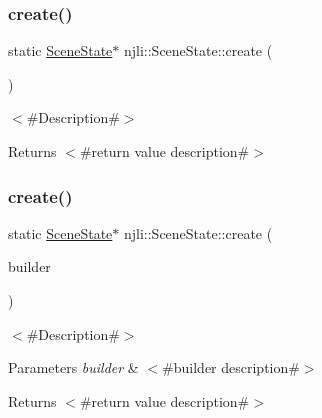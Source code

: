 \subsubsection{\texorpdfstring{create()}{create()}\hspace{0.1cm}{\footnotesize\ttfamily [2/3]}}
{\footnotesize\ttfamily static \mbox{\hyperlink{classnjli_1_1_scene_state}{Scene\+State}}$\ast$ njli\+::\+Scene\+State\+::create (\begin{DoxyParamCaption}{ }\end{DoxyParamCaption})\hspace{0.3cm}{\ttfamily [static]}}

$<$\#\+Description\#$>$

\begin{DoxyReturn}{Returns}
$<$\#return value description\#$>$ 
\end{DoxyReturn}
\mbox{\label{classnjli_1_1_scene_state_a61241c7c75c26c8b101933f902d59426}} 
\subsubsection{\texorpdfstring{create()}{create()}\hspace{0.1cm}{\footnotesize\ttfamily [3/3]}}
{\footnotesize\ttfamily static \mbox{\hyperlink{classnjli_1_1_scene_state}{Scene\+State}}$\ast$ njli\+::\+Scene\+State\+::create (\begin{DoxyParamCaption}\item[{const \mbox{\hyperlink{classnjli_1_1_scene_state_builder}{Scene\+State\+Builder}} \&}]{builder }\end{DoxyParamCaption})\hspace{0.3cm}{\ttfamily [static]}}

$<$\#\+Description\#$>$


\begin{DoxyParams}{Parameters}
{\em builder} & $<$\#builder description\#$>$\\
\hline
\end{DoxyParams}
\begin{DoxyReturn}{Returns}
$<$\#return value description\#$>$ 
\end{DoxyReturn}
\mbox{\label{classnjli_1_1_scene_state_a3010d62b1e488e95690af8cacfb33ed7}} 
